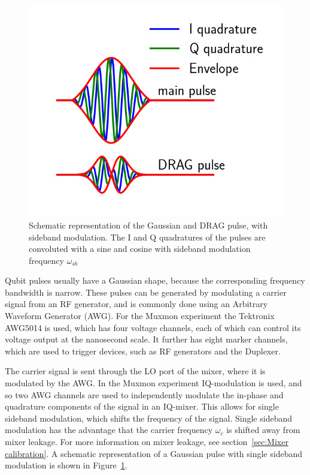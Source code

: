         \begin{figure}
          \begin{center}
          \vspace{-30pt}
            \includegraphics[width=\textwidth]{../Figures/Exploring frequency re-use/Pulses.png}
          \end{center}
          \vspace{-20 pt}
          \caption{Schematic representation of the Gaussian and DRAG pulse, with sideband modulation. The I and Q quadratures of the pulses are convoluted with a sine and cosine with sideband modulation frequency $\omega_{sb}$}
          \label{fig:gaussian and DRAG pulses}
        \end{figure}

        Qubit pulses usually have a Gaussian shape, because the corresponding frequency bandwidth is narrow. These pulses can be generated by modulating a carrier signal from an RF generator, and is commonly done using an Arbitrary Waveform Generator (AWG). For the Muxmon experiment the Tektronix AWG5014 is used, which has four voltage channels, each of which can control its voltage output at the nanosecond scale. It further has eight marker channels, which are used to trigger devices, such as RF generators and the Duplexer.

        The carrier signal is sent through the LO port of the mixer, where it is modulated by the AWG. In the Muxmon experiment IQ-modulation is used, and so two AWG channels are used to independently modulate the in-phase and quadrature components of the signal in an IQ-mixer. This allows for single sideband modulation, which shifts the frequency of the signal. Single sideband modulation has the advantage that the carrier frequency $\omega_c$ is shifted away from mixer leakage. For more information on mixer leakage, see section~\ref{sec:Mixer calibration}. A schematic representation of a Gaussian pulse with single sideband modulation is shown in Figure~\ref{fig:gaussian and DRAG pulses}.


